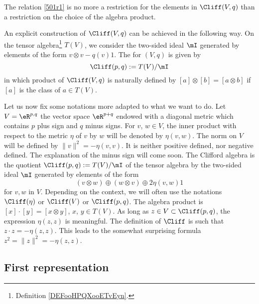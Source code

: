 \begin{remark}
The relation \eqref{501r1} is no more a restriction for the elements in $\Cliff(V,q)$ than a restriction on the choice of the algebra product.
\end{remark}


An explicit construction of $\Cliff(V,q)$ can be achieved in the following way. On the tensor algebra\footnote{Definition \ref{DEFooHPQXooETvEyn}.} \( T(V)\), we consider the two-sided ideal $\mI$ generated by elements of the form $v\otimes v-q(v)1$. The   for $(V,q)$ is given by
\begin{equation}	\label{defI}
	\Cliff(p,q):=T(V)/\mI
\end{equation}
in which product of $\Cliff(V,q)$ is naturally defined by $[a]\otimes[b]=[a\otimes b]$ if $[a]$ is the class of $a\in T(V)$.

Let us now fix some notations more adapted to what we want to do. Let $V=\eR^{p,q}$ the vector space $\eR^{p+q}$ endowed with a diagonal metric which contains $p$ plus sign and $q$ minus signs. For $v$, $w\in V$, the inner product with respect to the metric $\eta$ of $v$ by $w$ will be denoted by $\eta(v,w)$.  The norm on $V$ will be defined by $\|v\|^2=-\eta(v,v)$. It is neither positive defined, nor negative defined. The explanation of the minus sign will come soon. The Clifford algebra is the quotient $\Cliff(p,q):=T(V)/\mI$ of the tensor algebra by the two-sided ideal $\mI$ generated by elements of the form
\[
	(v\otimes w)\oplus (w\otimes v)\oplus 2\eta(v,w)1
\]
 for $v,w$ in $V$. Depending on the context, we will often use the notations $\Cliff(\eta)$ or $\Cliff(V)$ or $\Cliff(p,q)$. The algebra product is $[x]\cdot[y]=[x\otimes y]$, $x$, $y\in T(V)$.  As long as $z\in V\subset\Cliff(p,q)$, the expression $\eta(z,z)$ is meaningful. The definition of $\Cliff$ is such that $z\cdot z=-\eta(z,z)$. This leads to the somewhat surprising formula  $z^2=\|z\|^2=-\eta(z,z)$.

\subsection{First representation}

